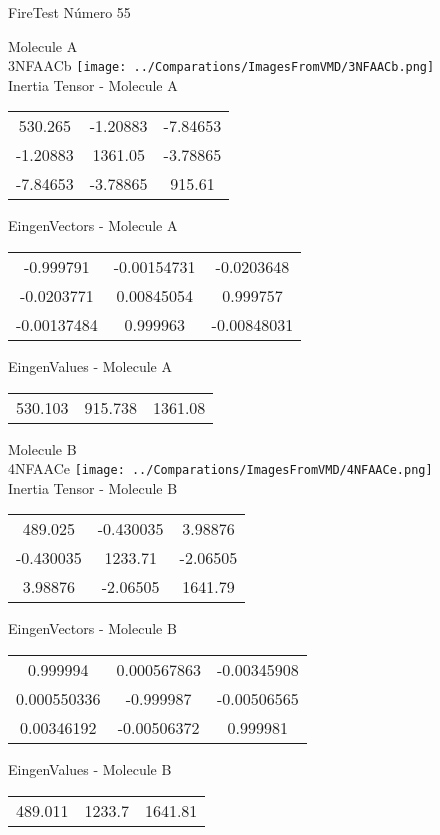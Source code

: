 \vtab[-2cm]
\begin{center}
{\large FireTest \tab Número 55}
\end{center}
\begin{multicols}{2}
\begin{center}

Molecule A \\ 
3NFAACb
\texttt{[image: ../Comparations/ImagesFromVMD/3NFAACb.png]}
\\
Inertia Tensor - Molecule A \\
\vtab

\begin{tabular}{|c c c|}
530.265	 & 	-1.20883	 & 	-7.84653	 \\
-1.20883	 & 	1361.05	 & 	-3.78865	 \\
-7.84653	 & 	-3.78865	 & 	915.61
\end{tabular}

\vtab
 EingenVectors - Molecule A     \\
\vtab
\begin{tabular}{|c c c|}
-0.999791	 & 	-0.00154731	 & 	-0.0203648	 \\
-0.0203771	 & 	0.00845054	 & 	0.999757	 \\
-0.00137484	 & 	0.999963	 & 	-0.00848031
\end{tabular}

\vtab
 EingenValues - Molecule A     \\
\vtab
\begin{tabular}{|c c c|}
530.103	 & 	915.738	 & 	1361.08	 \\
\end{tabular}
\columnbreak

Molecule B \\ 
4NFAACe
\texttt{[image: ../Comparations/ImagesFromVMD/4NFAACe.png]}
\\
Inertia Tensor - Molecule B \\
\vtab

\begin{tabular}{|c c c|}
489.025	 & 	-0.430035	 & 	3.98876	 \\
-0.430035	 & 	1233.71	 & 	-2.06505	 \\
3.98876	 & 	-2.06505	 & 	1641.79
\end{tabular}

\vtab
 EingenVectors - Molecule B     \\
\vtab
\begin{tabular}{|c c c|}
0.999994	 & 	0.000567863	 & 	-0.00345908	 \\
0.000550336	 & 	-0.999987	 & 	-0.00506565	 \\
0.00346192	 & 	-0.00506372	 & 	0.999981
\end{tabular}

\vtab
 EingenValues - Molecule B     \\
\vtab
\begin{tabular}{|c c c|}
489.011	 & 	1233.7	 & 	1641.81	 \\
\end{tabular}

\end{center}
\end{multicols}
